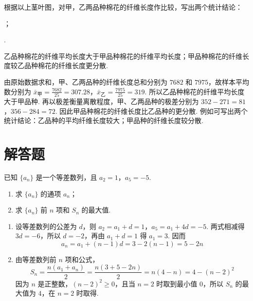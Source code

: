 \begin{problem}
根据以上茎叶图，对甲，乙两品种棉花的纤维长度作比较，写出两个统计结论：

\begin{circlelist}
\item\fillinblank{}；
\item\fillinblank{}.
\end{circlelist}

\begin{answer}
乙品种棉花的纤维平均长度大于甲品种棉花的纤维平均长度；甲品种棉花的纤维长度较乙品种棉花的纤维长度更分散.
\end{answer}

\begin{solution}
由原始数据求和，甲、乙两品种的纤维长度总和分别为 \(7682\) 和 \(7975\)，故样本平均数分别为
\(\bar x_{\text{甲}}=\frac{7682}{25}=307.28\)，\(\bar x_{\text{乙}}=\frac{7975}{25}=319\).
所以乙品种棉花的纤维平均长度大于甲品种. 再以极差衡量离散程度，甲、乙两品种的极差分别为
\(352-271=81\)，\(356-284=72\).
因此甲品种棉花的纤维长度比乙品种的更分散. 例如可写出两个统计结论：乙品种的平均纤维长度较大；甲品种的纤维长度较分散.
\end{solution}
\end{problem}

\section{解答题}

\begin{problem}
已知 \(\{a_{n}\}\) 是一个等差数列，且 \(a_{2} = 1\)，\(a_{5} = -5\).

\begin{enumerate}
\item 求 \(\{a_{n}\}\) 的通项 \(a_{n}\)；
\item 求 \(\{a_{n}\}\) 前 \(n\) 项和 \(S_{n}\) 的最大值.
\end{enumerate}

\begin{solution}
\begin{enumerate}
\item 设等差数列的公差为 \(d\)，则
\(a_2=a_1+d=1\)，\(a_5=a_1+4d=-5\).
两式相减得 \(3d=-6\)，所以 \(d=-2\)，再由 \(a_1+d=1\) 得 \(a_1=3\). 因而
\[
a_n=a_1+(n-1)d=3-2(n-1)=5-2n
\]
\item 由等差数列前 \(n\) 项和公式，
\[
S_n=\frac{n\left(a_1+a_n\right)}{2}=\frac{n\left(3+5-2n\right)}{2}=n(4-n)=4-(n-2)^2
\]
因为 \(n\) 是正整数，\((n-2)^2\ge0\)，且当 \(n=2\) 时取到最小值 \(0\)，所以 \(S_n\) 的最大值为 \(4\)，在 \(n=2\) 时取得.
\end{enumerate}
\end{solution}
\end{problem}


